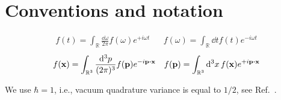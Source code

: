 \section{Conventions and notation}


\begin{align}
	f(t)
	=
	\int_{\mathbb{R}}\frac{\dd{\omega}}{2\pi}
	f(\omega)
	e^{+i\omega t}
	&&
	f(\omega)
	=
	\int_{\mathbb{R}}\dd{t}
	f(t)
	e^{-i\omega t}
\end{align}
\begin{align}
	f(\vb{x})
	=
	\int_{\mathbb{R}^3}\frac{\dd[3]{p}}{(2\pi)^3}
	f(\vb{p})
	e^{-i\vb{p}\vdot\vb{x}}
	&&
	f(\vb{p})
	=
	\int_{\mathbb{R}^3}\dd[3]{x}
	f(\vb{x})
	e^{+i\vb{p}\vdot\vb{x}}
\end{align}

We use $\hbar=1$, i.e., vacuum quadrature variance is equal to $1/2$, see Ref.~\cite[p.~4]{Weedbrook2012}.